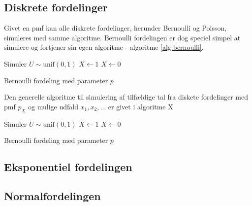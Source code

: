\subsection{Diskrete fordelinger}
Givet en pmf kan alle diskrete fordelinger, herunder Bernoulli og Poisson, simuleres med samme algoritme. Bernoulli fordelingen er dog speciel simpel at simulere og fortjener sin egen algoritme - algoritme \ref{alg:bernoulli}. 
\begin{algorithm}[H]
\begin{algorithmic}
\STATE Simuler $U \sim \text{unif}(0,1)$
\STATE $X \gets 1$
\ELSE
\STATE $X \gets 0$
\ENDIF
\end{algorithmic}
\caption{Bernoulli fordeling med parameter $p$} \label{alg:bernoulli}
\end{algorithm}
Den generelle algoritme til simulering af tilfældige tal fra diskete fordelinger med pmf $p_X$ og mulige udfald $x_1, x_2,\dots$ er givet i algoritme X
\begin{algorithm}[H]
\begin{algorithmic}
\STATE Simuler $U \sim \text{unif}(0,1)$
\STATE $X \gets 1$
\ELSE
\STATE $X \gets 0$
\ENDIF
\end{algorithmic}
\caption{Bernoulli fordeling med parameter $p$} \label{alg:bernoulli}
\end{algorithm}
\subsection{Eksponentiel fordelingen}
\subsection{Normalfordelingen}